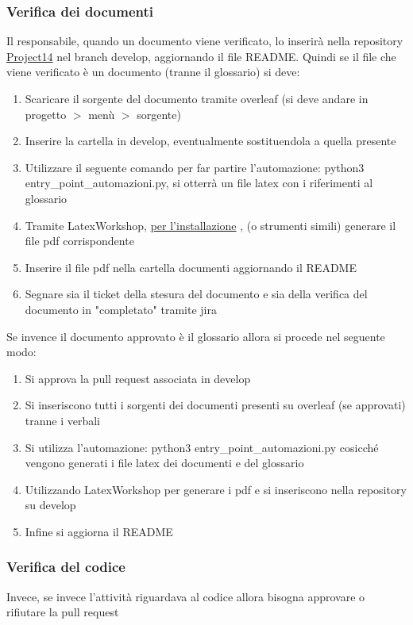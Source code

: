 \subsubsection{Verifica dei documenti}
Il responsabile, quando un documento viene verificato, lo inserirà nella repository \href{https://github.com/RAMtastic6/Project14}{Project14} nel branch develop, aggiornando il file README.
Quindi se il file che viene verificato è un documento (tranne il glossario) si deve:
\begin{enumerate}
    \item Scaricare il sorgente del documento tramite overleaf (si deve andare in progetto $>$ menù $>$ sorgente)
    \item Inserire la cartella in develop, eventualmente sostituendola a quella presente
    \item Utilizzare il seguente comando per far partire l'automazione: python3 entry\_point\_automazioni.py, si otterrà un file latex con i riferimenti al glossario
    \item Tramite LatexWorkshop, \href{https://github.com/James-Yu/LaTeX-Workshop/wiki/Install}{per l'installazione} , (o strumenti simili) generare il file pdf corrispondente
    \item Inserire il file pdf nella cartella documenti aggiornando il README
    \item Segnare sia il ticket della stesura del documento e sia della verifica del documento in "completato" tramite jira
\end{enumerate}
Se invence il documento approvato è il glossario allora si procede nel seguente modo:
\begin{enumerate}
    \item Si approva la pull request associata in develop
    \item Si inseriscono tutti i sorgenti dei documenti presenti su overleaf (se approvati) tranne i verbali
    \item Si utilizza l'automazione: python3 entry\_point\_automazioni.py
    cosicché vengono generati i file latex dei documenti e del glossario
    \item Utilizzando LatexWorkshop per generare i pdf e si inseriscono nella repository su develop
    \item Infine si aggiorna il README
\end{enumerate}
\subsubsection{Verifica del codice}
Invece, se invece l'attività riguardava al codice allora bisogna approvare o rifiutare la pull request
